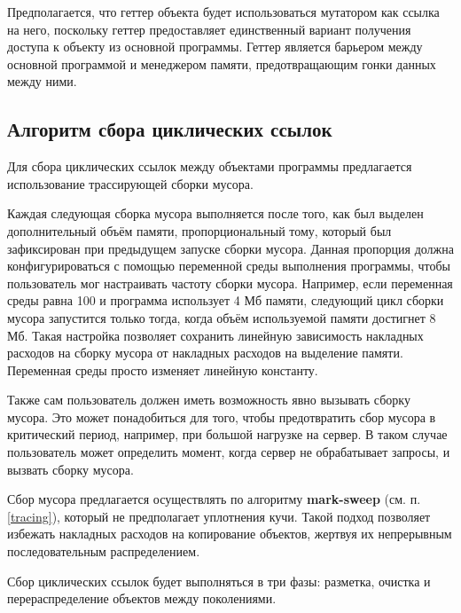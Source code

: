 Предполагается, что геттер объекта будет использоваться мутатором как ссылка на него, поскольку геттер предоставляет единственный вариант получения доступа к объекту из основной программы. Геттер является барьером между основной программой и менеджером памяти, предотвращающим гонки данных между ними.



\subsection*{Алгоритм сбора циклических ссылок}

Для сбора циклических ссылок между объектами программы предлагается использование трассирующей сборки мусора.

Каждая следующая сборка мусора выполняется после того, как был выделен дополнительный объём памяти, пропорциональный тому, который был зафиксирован при предыдущем запуске сборки мусора. Данная пропорция должна конфигурироваться с помощью переменной среды выполнения программы, чтобы пользователь мог настраивать частоту сборки мусора. Например, если переменная среды равна 100 и программа использует 4 Мб памяти, следующий цикл сборки мусора запустится только тогда, когда объём используемой памяти достигнет 8 Мб. Такая настройка позволяет сохранить линейную зависимость накладных расходов на сборку мусора от накладных расходов на выделение памяти. Переменная среды просто изменяет линейную константу.

Также сам пользователь должен иметь возможность явно вызывать сборку мусора. Это может понадобиться для того, чтобы предотвратить сбор мусора в критический период, например, при большой нагрузке на сервер. В таком случае пользователь может определить момент, когда сервер не обрабатывает запросы, и вызвать сборку мусора.

Сбор мусора предлагается осуществлять по алгоритму \textbf{mark-sweep} (см. п. \ref{tracing}), который не предполагает уплотнения кучи. Такой подход позволяет избежать накладных расходов на копирование объектов, жертвуя их непрерывным последовательным распределением.

Сбор циклических ссылок будет выполняться в три фазы: разметка, очистка и перераспределение объектов между поколениями.

